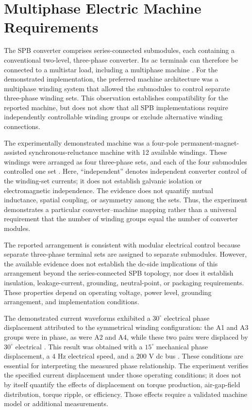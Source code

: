 \section{Multiphase Electric Machine Requirements}

The SPB converter comprises series-connected submodules, each containing a conventional two-level, three-phase converter. Its ac terminals can therefore be connected to a multistar load, including a multiphase machine \cite{Jin2017}. For the demonstrated implementation, the preferred machine architecture was a multiphase winding system that allowed the submodules to control separate three-phase winding sets. This observation establishes compatibility for the reported machine, but does not show that all SPB implementations require independently controllable winding groups or exclude alternative winding connections.

The experimentally demonstrated machine was a four-pole permanent-magnet-assisted synchronous-reluctance machine with 12 available windings. These windings were arranged as four three-phase sets, and each of the four submodules controlled one set \cite{Jin2017}. Here, ``independent'' denotes independent converter control of the winding-set currents; it does not establish galvanic isolation or electromagnetic independence. The evidence does not quantify mutual inductance, spatial coupling, or asymmetry among the sets. Thus, the experiment demonstrates a particular converter--machine mapping rather than a universal requirement that the number of winding groups equal the number of converter modules.

The reported arrangement is consistent with modular electrical control because separate three-phase terminal sets are assigned to separate submodules. However, the available evidence does not establish the dc-side implications of this arrangement beyond the series-connected SPB topology, nor does it establish insulation, leakage-current, grounding, neutral-point, or packaging requirements. These properties depend on operating voltage, power level, grounding arrangement, and implementation conditions. %

The demonstrated current waveforms exhibited a $30^{\circ}$ electrical phase displacement attributed to the symmetrical winding configuration: the A1 and A3 groups were in phase, as were A2 and A4, while these two pairs were displaced by $30^{\circ}$ electrical \cite{Jin2017}. This result was obtained with a $15^{\circ}$ mechanical phase displacement, a $4$ Hz electrical speed, and a $200$ V dc bus \cite{Jin2017}. These conditions are essential for interpreting the measured phase relationship. The experiment verifies the specified current displacement under those operating conditions; it does not by itself quantify the effects of displacement on torque production, air-gap-field distribution, torque ripple, or efficiency. Those effects require a validated machine model or additional measurements. %

